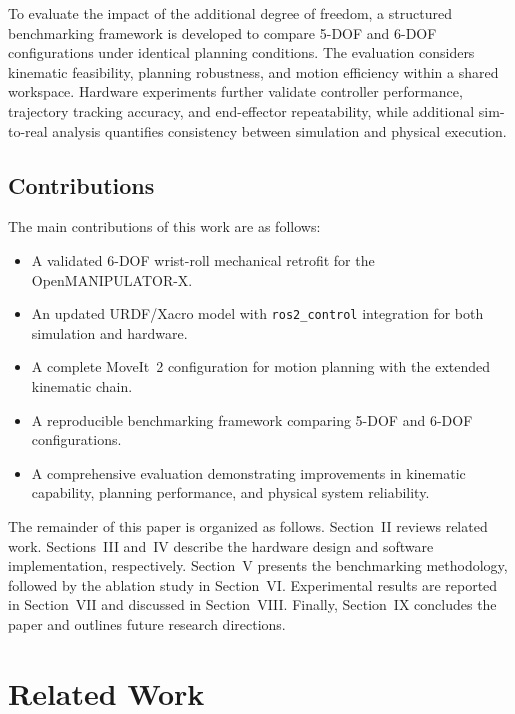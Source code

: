 \documentclass[conference]{IEEEtran}
\begin{document}
	To evaluate the impact of the additional degree of freedom, a
	structured benchmarking framework is developed to compare 5-DOF and
	6-DOF configurations under identical planning conditions. The
	evaluation considers kinematic feasibility, planning robustness, and
	motion efficiency within a shared workspace. Hardware experiments
	further validate controller performance, trajectory tracking accuracy,
	and end-effector repeatability, while additional sim-to-real analysis
	quantifies consistency between simulation and physical execution.
	
	\subsection*{Contributions}
	The main contributions of this work are as follows:
	
	\begin{itemize}
		\item A validated 6-DOF wrist-roll mechanical retrofit for the
		OpenMANIPULATOR-X.
		\item An updated URDF/Xacro model with \texttt{ros2\_control}
		integration for both simulation and hardware.
		\item A complete MoveIt~2 configuration for motion planning
		with the extended kinematic chain.
		\item A reproducible benchmarking framework comparing 5-DOF
		and 6-DOF configurations.
		\item A comprehensive evaluation demonstrating improvements in
		kinematic capability, planning performance, and physical system
		reliability.
	\end{itemize}
	
	The remainder of this paper is organized as follows. Section~II reviews
	related work. Sections~III and~IV describe the hardware design and
	software implementation, respectively. Section~V presents the
	benchmarking methodology, followed by the ablation study in
	Section~VI. Experimental results are reported in Section~VII and
	discussed in Section~VIII. Finally, Section~IX concludes the paper
	and outlines future research directions.
	
	
	\section{Related Work}
	\label{sec:related_work}
	
\end{document}
